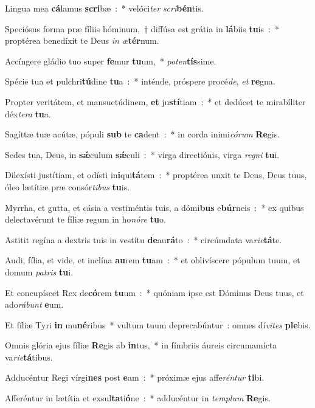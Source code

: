 \item Lingua mea \textbf{cá}lamus \textbf{scri}bæ~:~* velóci\emph{ter} \emph{scri}\textbf{bén}tis.
\item Speciósus forma præ fíliis hóminum,~† diffúsa est grátia in \textbf{lá}biis \textbf{tu}is~:~* proptérea benedíxit te Deus \emph{in} \emph{æ}\textbf{tér}num.
\item Accíngere gládio tuo super \textbf{fe}mur \textbf{tu}um,~* \emph{po}\emph{ten}\textbf{tís}sime.
\item Spécie tua et pulchri\textbf{tú}dine \textbf{tu}a~:~* inténde, próspere procé\emph{de}, \emph{et} \textbf{re}gna.
\item Propter veritátem, et mansuetúdinem, \textbf{et} ju\textbf{stí}tiam~:~* et dedúcet te mirabíliter déx\emph{te}\emph{ra} \textbf{tu}a.
\item Sagíttæ tuæ acútæ, pópuli \textbf{sub} te \textbf{ca}dent~:~* in corda inimi\emph{có}\emph{rum} \textbf{Re}gis.
\item Sedes tua, Deus, in \textbf{sǽ}culum \textbf{sǽ}culi~:~* virga directiónis, virga \emph{re}\emph{gni} \textbf{tu}i.
\item Dilexísti justítiam, et odísti in\textbf{i}qui\textbf{tá}tem~:~* proptérea unxit te Deus, Deus tuus, óleo lætítiæ præ consór\emph{ti}\emph{bus} \textbf{tu}is.
\item Myrrha, et gutta, et cásia a vestiméntis tuis, a dómi\textbf{bus} e\textbf{búr}neis~:~* ex quibus delectavérunt te fíliæ regum in ho\emph{nó}\emph{re} \textbf{tu}o.
\item Astitit regína a dextris tuis in vestítu \textbf{de}au\textbf{rá}to~:~* circúmdata va\emph{ri}\emph{e}\textbf{tá}te.
\item Audi, fília, et vide, et inclína \textbf{au}rem \textbf{tu}am~:~* et oblivíscere pópulum tuum, et domum \emph{pa}\emph{tris} \textbf{tu}i.
\item Et concupíscet Rex de\textbf{có}rem \textbf{tu}um~:~* quóniam ipse est Dóminus Deus tuus, et ado\emph{rá}\emph{bunt} \textbf{e}um.
\item Et fíliæ Tyri \textbf{in} mu\textbf{né}ribus~* vultum tuum de\-pre\-ca\-bún\-tur~: omnes dí\emph{vi}\emph{tes} \textbf{ple}bis.
\item Omnis glória ejus fíliæ \textbf{Re}gis ab \textbf{in}tus,~* in fímbriis áureis circumamícta va\emph{ri}\emph{e}\textbf{tá}tibus.
\item Adducéntur Regi vírgi\textbf{nes} post \textbf{e}am~:~* próximæ ejus affe\emph{rén}\emph{tur} \textbf{ti}bi.
\item Afferéntur in lætítia et exsul\textbf{ta}ti\textbf{ó}ne~:~* adducéntur in \emph{tem}\emph{plum} \textbf{Re}gis.
